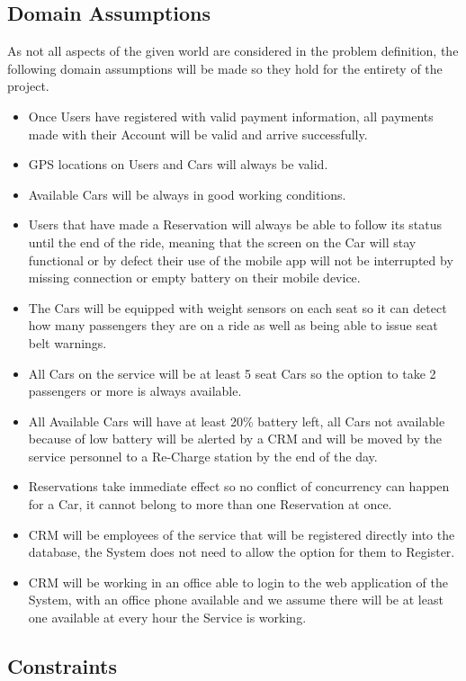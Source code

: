 \documentclass[a4paper]{article}
\begin{document}
\subsection{Domain Assumptions}
As not all aspects of the given world are considered in the problem definition, the following domain assumptions will be made so they hold for the entirety of the project.
\begin{itemize}
\item Once Users have registered with valid payment information, all payments made with their Account will be valid and arrive successfully.
\item GPS locations on Users and Cars will always be valid.
\item Available Cars will be always in good working conditions.
\item Users that have made a Reservation will always be able to follow its status until the end of the ride, meaning that the screen on the Car will stay functional or by defect their use of the mobile app will not be interrupted by missing connection or empty battery on their mobile device.
\item The Cars will be equipped with weight sensors on each seat so it can detect how many passengers they are on a ride as well as being able to issue seat belt warnings.
\item All Cars on the service will be at least 5 seat Cars so the option to take 2 passengers or more is always available.
\item All Available Cars will have at least 20\% battery left, all Cars not available because of low battery will be alerted by a CRM and will be moved by the service personnel to a Re-Charge station by the end of the day. 
\item Reservations take immediate effect so no conflict of concurrency can happen for a Car, it cannot belong to more than one Reservation at once.
\item CRM will be employees of the service that will be registered directly into the database, the System does not need to allow the option for them to Register. 
\item CRM will be working in an office able to login to the web application of the System, with an office phone available and we assume there will be at least one available at every hour the Service is working. 
\end{itemize}

\subsection{Constraints}
\end{document}
